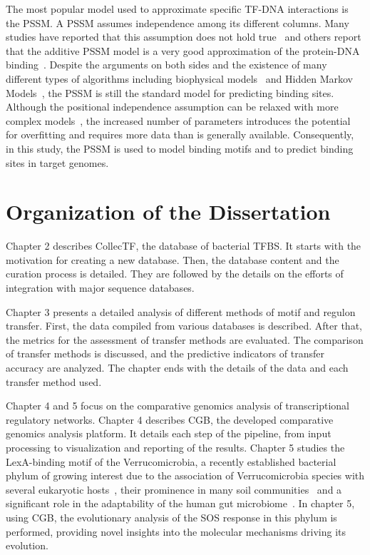 The most popular model used to approximate specific TF-DNA interactions is the
PSSM\@. A PSSM assumes independence among its different columns. Many studies
have reported that this assumption does not hold true~\cite{man2001non,
  bulyk2002nucleotides, tomovic2007position, osada2004comparative} and others
report that the additive PSSM model is a very good approximation of the
protein-DNA binding~\cite{benos2002additivity}. Despite the arguments on both
sides and the existence of many different types of algorithms including
biophysical models~\cite{stormo1998specificity, djordjevic2003biophysical} and
Hidden Markov Models~\cite{sinha2003probabilistic, drawid2009ohmm,
  salzberg1998microbial}, the PSSM is still the standard model for predicting
binding sites. Although the positional independence assumption can be relaxed
with more complex models~\cite{ben2005identification, zhao2012improved,
  siddharthan2010dinucleotide, barash2003modeling}, the increased number of
parameters introduces the potential for overfitting and requires more data than
is generally available. Consequently, in this study, the PSSM is used to model
binding motifs and to predict binding sites in target genomes.

\section{Organization of the Dissertation}

Chapter 2 describes CollecTF, the database of bacterial TFBS. It starts with
the motivation for creating a new database. Then, the database content and the
curation process is detailed. They are followed by the details on the efforts
of integration with major sequence databases.

Chapter 3 presents a detailed analysis of different methods of motif and
regulon transfer. First, the data compiled from various databases is
described. After that, the metrics for the assessment of transfer methods are
evaluated. The comparison of transfer methods is discussed, and the predictive
indicators of transfer accuracy are analyzed. The chapter ends with the details
of the data and each transfer method used.

Chapter 4 and 5 focus on the comparative genomics analysis of transcriptional
regulatory networks. Chapter 4 describes CGB, the developed comparative
genomics analysis platform. It details each step of the pipeline, from input
processing to visualization and reporting of the results. Chapter 5 studies the
LexA-binding motif of the Verrucomicrobia, a recently established bacterial
phylum of growing interest due to the association of Verrucomicrobia species
with several eukaryotic hosts~\cite{sait2011genomic}, their prominence in many
soil communities~\cite{bergmann2011under} and a significant role in the
adaptability of the human gut microbiome~\cite{dubourg2013high}. In chapter 5,
using CGB, the evolutionary analysis of the SOS response in this phylum is
performed, providing novel insights into the molecular mechanisms driving its
evolution.
